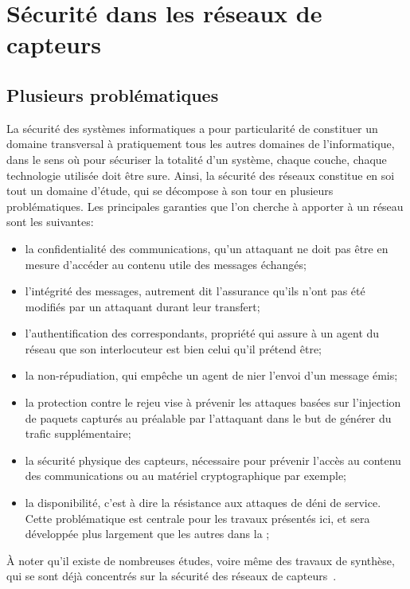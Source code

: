\section{Sécurité dans les réseaux de capteurs}\label{ea:sec:secu}

\subsection{Plusieurs problématiques}

La sécurité des systèmes informatiques a pour particularité de constituer un domaine transversal à pratiquement tous les autres domaines de l'informatique, dans le sens où pour sécuriser la totalité d'un système, chaque couche, chaque technologie utilisée doit être sure.
Ainsi, la sécurité des réseaux constitue en soi tout un domaine d'étude, qui se décompose à son tour en plusieurs problématiques.
Les principales garanties que l'on cherche à apporter à un réseau sont les suivantes:
\begin{itemize}
    \item la confidentialité des communications, \cad qu'un attaquant ne doit pas être en mesure d'accéder au contenu utile des messages échangés;
    \item l'intégrité des messages, autrement dit l'assurance qu'ils n'ont pas été modifiés par un attaquant durant leur transfert;
    \item l'authentification des correspondants, propriété qui assure à un agent du réseau que son interlocuteur est bien celui qu'il prétend être;
    \item la non-répudiation, qui empêche un agent de nier l'envoi d'un message émis;
    \item la protection contre le rejeu vise à prévenir les attaques basées sur l'injection de paquets capturés au préalable par l'attaquant dans le but de générer du trafic supplémentaire;
    \item la sécurité physique des capteurs, nécessaire pour prévenir l'accès au contenu des communications ou au matériel cryptographique par exemple;
    \item la disponibilité, c'est à dire la résistance aux attaques de déni de service. Cette problématique est centrale pour les travaux présentés ici, et sera développée plus largement que les autres dans la ;
\end{itemize}
À noter qu'il existe de nombreuses études, voire même des travaux de synthèse, qui se sont déjà concentrés sur la sécurité des réseaux de capteurs~\cite{DYK12,AD14}.

